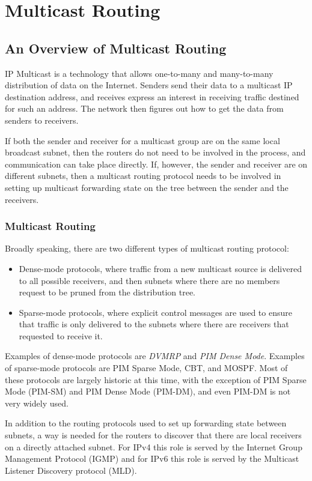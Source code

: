 \chapter{Multicast Routing}
\label{multicast}
\section{An Overview of Multicast Routing}

IP Multicast is a technology that allows one-to-many and many-to-many
distribution of data on the Internet.  Senders send their data to a
multicast IP destination address, and receives express an interest in
receiving traffic destined for such an address.  The network then
figures out how to get the data from senders to receivers.  

If both the sender and receiver for a multicast group are on the same
local broadcast subnet, then the routers do not need to be involved in
the process, and communication can take place directly.  If, however,
the sender and receiver are on different subnets, then a multicast
routing protocol needs to be involved in setting up multicast
forwarding state on the tree between the sender and the receivers.

\subsection{Multicast Routing}

Broadly speaking, there are two different types of multicast routing
protocol:
\begin{itemize}
\item Dense-mode protocols, where traffic from a new multicast source
  is delivered to all possible receivers, and then subnets where there
  are no members request to be pruned from the distribution tree.
\item Sparse-mode protocols, where explicit control messages are used
  to ensure that traffic is only delivered to the subnets where there
  are receivers that requested to receive it.
\end{itemize}
Examples of dense-mode protocols are {\it DVMRP} and {\it PIM Dense
Mode}.  Examples of sparse-mode protocols are PIM Sparse Mode, CBT,
and MOSPF.  Most of these protocols are largely historic at this time,
with the exception of PIM Sparse Mode (PIM-SM) and PIM Dense Mode
(PIM-DM), and even PIM-DM is not very widely used.

In addition to the routing protocols used to set up forwarding state
between subnets, a way is needed for the routers to discover that
there are local receivers on a directly attached subnet.  For IPv4
this role is served by the Internet Group Management Protocol (IGMP)
and for IPv6 this role is served by the Multicast Listener Discovery
protocol (MLD).


